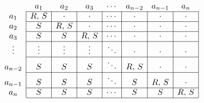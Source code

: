 $
  \begin{array}{c|c|c|c|c|c|c|c|}
    \multicolumn{1}{c}{} & \multicolumn{1}{c}{a_1} & \multicolumn{1}{c}{a_2} & \multicolumn{1}{c}{a_3} & \multicolumn{1}{c}{\cdots} & \multicolumn{1}{c}{a_{n-2}} & \multicolumn{1}{c}{a_{n-1}} & \multicolumn{1}{c}{a_n} \\ \cline{2-8}
    a_1                  & R,\, S                  & \cdot                   & \cdot                   & \cdots                     & \cdot                       & \cdot                       & \cdot                   \\ \cline{2-8}
    a_2                  & S                       & R,\, S                  & \cdot                   & \cdots                     & \cdot                       & \cdot                       & \cdot                   \\ \cline{2-8}
    a_3                  & S                       & S                       & R,\, S                  & \cdots                     & \cdot                       & \cdot                       & \cdot                   \\ \cline{2-8}
    \vdots               & \vdots                  & \vdots                  & \vdots                  & \ddots                     & \cdot                       & \cdot                       & \cdot                   \\ \cline{2-8}
    a_{n-2}              & S                       & S                       & S                       & \ddots                     & R,\, S                      & \cdot                       & \cdot                   \\ \cline{2-8}
    a_{n-1}              & S                       & S                       & S                       & \ddots                     & S                           & R,\, S                      & \cdot                   \\ \cline{2-8}
    a_n                  & S                       & S                       & S                       & \cdots                     & S                           & S                           & R,\, S                  \\ \cline{2-8}
  \end{array}
$

\hacer

\begin{aportes}
  \item {}
\end{aportes}
